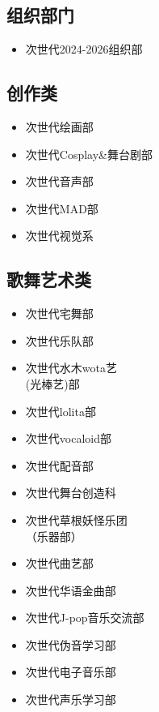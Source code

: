 \documentclass[twoside,12pt]{book}
\newenvironment{categorysection}[1]{
  \subsection*{\textcolor{truepurple}{#1}}
  \begin{itemize}[leftmargin=*, 
                 nosep,               %
                 itemsep=2pt,         %
                 parsep=0pt,          %
                 before=\setlength{\baselineskip}{23pt} %
  ]
}{
  \end{itemize}
}
\begin{document}
\vfill
\newpage
\flushleft
\begin{multicols}{3}
    
    \begin{categorysection}{组织部门}
        \item 次世代2024-2026组织部
    \end{categorysection}
    
    \begin{categorysection}{创作类}
        \item 次世代绘画部
        \item 次世代Cosplay\&舞台剧部
        \item 次世代音声部
        \item 次世代MAD部
        \item 次世代视觉系
    \end{categorysection}
    
    \begin{categorysection}{歌舞艺术类}
        \item 次世代宅舞部
        \item 次世代乐队部
        \item 次世代水木wota艺\\(光棒艺)部
        \item 次世代lolita部
        \item 次世代vocaloid部
        \item 次世代配音部
        \item 次世代舞台创造科
        \item 次世代草根妖怪乐团\\（乐器部）
        \item 次世代曲艺部
        \item 次世代华语金曲部
        \item 次世代J-pop音乐交流部
        \item 次世代伪音学习部
        \item 次世代电子音乐部
        \item 次世代声乐学习部
    \end{categorysection}
    

\end{multicols}
\end{document}
